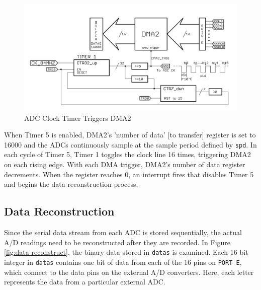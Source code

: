 \documentclass[11pt,twoside]{mitthesis}
\begin{document}
\begin{figure}[H]
  \begin{center}
      \includegraphics[width=1\textwidth]{../ADC-DMA.png}
      \caption{ADC Clock Timer Triggers DMA2}
  \end{center}
\end{figure}

When Timer 5 is enabled, DMA2's 'number of data' [to transfer] register is set to 16000  and the ADCs continuously sample at the sample period defined by \texttt{spd}.
In each cycle of Timer 5, Timer 1 toggles the clock line 16 times, triggering DMA2 on each rising edge.
With each DMA trigger, DMA2's number of data register decrements.
When the register reaches 0, an interrupt fires that disables Timer 5 and begins the data reconstruction process.


\subsection{Data Reconstruction}

Since the serial data stream from each ADC is stored sequentially, the actual A/D readings need to be reconstructed after they are recorded.
In Figure \ref{fig:data-reconstruct}, the binary data stored in \texttt{datas} is examined.
Each 16-bit integer in \texttt{datas} contains one bit of data from each of the 16 pins on \texttt{PORT E}, which connect to the data pins on the external A/D converters.
Here, each letter represents the data from a particular external ADC.
\end{document}
